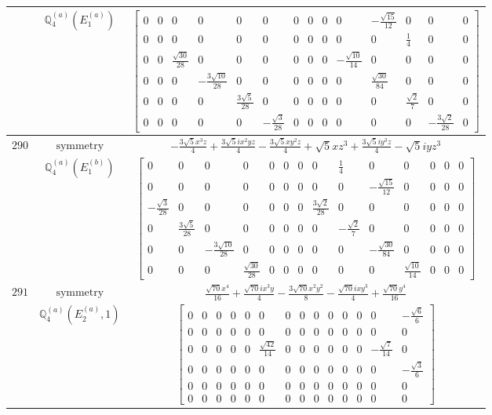 \documentclass[fleqn,8pt,landscape]{jsarticle}
\begin{document}
\begin{longtable}{ccc}
$  $ & $ \mathbb{Q}_{4}^{(a)}(E_{1}^{(a)}) $ & $ \begin{bmatrix} 0 & 0 & 0 & 0 & 0 & 0 & 0 & 0 & 0 & 0 & - \frac{\sqrt{15}}{12} & 0 & 0 & 0 \\ 0 & 0 & 0 & 0 & 0 & 0 & 0 & 0 & 0 & 0 & 0 & \frac{1}{4} & 0 & 0 \\ 0 & 0 & \frac{\sqrt{30}}{28} & 0 & 0 & 0 & 0 & 0 & 0 & - \frac{\sqrt{10}}{14} & 0 & 0 & 0 & 0 \\ 0 & 0 & 0 & - \frac{3 \sqrt{10}}{28} & 0 & 0 & 0 & 0 & 0 & 0 & \frac{\sqrt{30}}{84} & 0 & 0 & 0 \\ 0 & 0 & 0 & 0 & \frac{3 \sqrt{5}}{28} & 0 & 0 & 0 & 0 & 0 & 0 & \frac{\sqrt{2}}{7} & 0 & 0 \\ 0 & 0 & 0 & 0 & 0 & - \frac{\sqrt{3}}{28} & 0 & 0 & 0 & 0 & 0 & 0 & - \frac{3 \sqrt{2}}{28} & 0 \end{bmatrix} $ \\ \hline
$ 290 $ & $ \text{symmetry} $ & $ - \frac{3 \sqrt{5} x^{3} z}{4} + \frac{3 \sqrt{5} i x^{2} y z}{4} - \frac{3 \sqrt{5} x y^{2} z}{4} + \sqrt{5} x z^{3} + \frac{3 \sqrt{5} i y^{3} z}{4} - \sqrt{5} i y z^{3} $ \\
$  $ & $ \mathbb{Q}_{4}^{(a)}(E_{1}^{(b)}) $ & $ \begin{bmatrix} 0 & 0 & 0 & 0 & 0 & 0 & 0 & 0 & \frac{1}{4} & 0 & 0 & 0 & 0 & 0 \\ 0 & 0 & 0 & 0 & 0 & 0 & 0 & 0 & 0 & - \frac{\sqrt{15}}{12} & 0 & 0 & 0 & 0 \\ - \frac{\sqrt{3}}{28} & 0 & 0 & 0 & 0 & 0 & 0 & \frac{3 \sqrt{2}}{28} & 0 & 0 & 0 & 0 & 0 & 0 \\ 0 & \frac{3 \sqrt{5}}{28} & 0 & 0 & 0 & 0 & 0 & 0 & - \frac{\sqrt{2}}{7} & 0 & 0 & 0 & 0 & 0 \\ 0 & 0 & - \frac{3 \sqrt{10}}{28} & 0 & 0 & 0 & 0 & 0 & 0 & - \frac{\sqrt{30}}{84} & 0 & 0 & 0 & 0 \\ 0 & 0 & 0 & \frac{\sqrt{30}}{28} & 0 & 0 & 0 & 0 & 0 & 0 & \frac{\sqrt{10}}{14} & 0 & 0 & 0 \end{bmatrix} $ \\ \hline
$ 291 $ & $ \text{symmetry} $ & $ \frac{\sqrt{70} x^{4}}{16} + \frac{\sqrt{70} i x^{3} y}{4} - \frac{3 \sqrt{70} x^{2} y^{2}}{8} - \frac{\sqrt{70} i x y^{3}}{4} + \frac{\sqrt{70} y^{4}}{16} $ \\
$  $ & $ \mathbb{Q}_{4}^{(a)}(E_{2}^{(a)},1) $ & $ \begin{bmatrix} 0 & 0 & 0 & 0 & 0 & 0 & 0 & 0 & 0 & 0 & 0 & 0 & 0 & - \frac{\sqrt{6}}{6} \\ 0 & 0 & 0 & 0 & 0 & 0 & 0 & 0 & 0 & 0 & 0 & 0 & 0 & 0 \\ 0 & 0 & 0 & 0 & 0 & \frac{\sqrt{42}}{14} & 0 & 0 & 0 & 0 & 0 & 0 & - \frac{\sqrt{7}}{14} & 0 \\ 0 & 0 & 0 & 0 & 0 & 0 & 0 & 0 & 0 & 0 & 0 & 0 & 0 & - \frac{\sqrt{3}}{6} \\ 0 & 0 & 0 & 0 & 0 & 0 & 0 & 0 & 0 & 0 & 0 & 0 & 0 & 0 \\ 0 & 0 & 0 & 0 & 0 & 0 & 0 & 0 & 0 & 0 & 0 & 0 & 0 & 0 \end{bmatrix} $ \\ \hline

\end{longtable}
\end{document}

